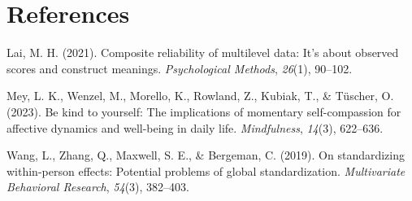 \documentclass[
  man,floatsintext]{apa6}
\newlength{\cslhangindent}
\newlength{\cslentryspacingunit} %
\newenvironment{CSLReferences}[2] %
 {%
  \setlength{\parindent}{0pt}
  \ifodd #1
  \let\oldpar\par
  \def\par{\hangindent=\cslhangindent\oldpar}
  \fi
  \setlength{\parskip}{#2\cslentryspacingunit}
 }%
 {}
\begin{document}
\hypertarget{references}{%
\section{References}\label{references}}

\hypertarget{refs}{}
\begin{CSLReferences}{1}{0}
\leavevmode{}%
Lai, M. H. (2021). Composite reliability of multilevel data: It's about observed scores and construct meanings. \emph{Psychological Methods}, \emph{26}(1), 90--102.

\leavevmode{}%
Mey, L. K., Wenzel, M., Morello, K., Rowland, Z., Kubiak, T., \& Tüscher, O. (2023). Be kind to yourself: The implications of momentary self-compassion for affective dynamics and well-being in daily life. \emph{Mindfulness}, \emph{14}(3), 622--636.

\leavevmode{}%
Wang, L., Zhang, Q., Maxwell, S. E., \& Bergeman, C. (2019). On standardizing within-person effects: Potential problems of global standardization. \emph{Multivariate Behavioral Research}, \emph{54}(3), 382--403.

\end{CSLReferences}
\end{document}
